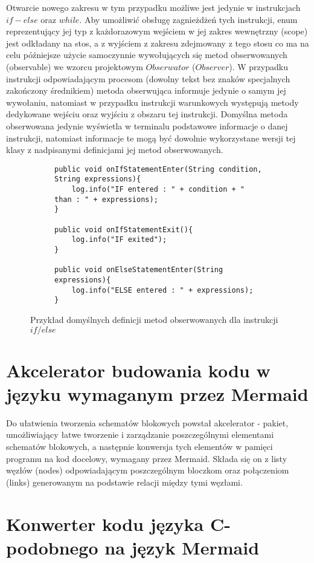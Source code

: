 \begin{itemize}
	 Otwarcie nowego zakresu w tym przypadku możliwe jest jedynie w instrukcjach $if - else$ oraz $while$. Aby umożliwić obsługę zagnieżdżeń tych instrukcji, enum reprezentujący jej typ z każdorazowym wejściem w jej zakres wewnętrzny (scope) jest odkładany na stos, a z wyjściem z zakresu zdejmowany z tego stosu co ma na celu późniejsze użycie samoczynnie wywołujących się metod obserwowanych (observable) we wzorcu projektowym $Obserwator$ ($Observer$). W przypadku instrukcji odpowiadającym procesom (dowolny tekst bez znaków specjalnych zakończony średnikiem) metoda obserwująca informuje jedynie o samym jej wywołaniu, natomiast w przypadku instrukcji warunkowych występują metody dedykowane wejściu oraz wyjściu z obszaru tej instrukcji. Domyślna metoda obserwowana jedynie wyświetla w terminalu podstawowe informacje o danej instrukcji, natomiast informacje te mogą być dowolnie wykorzystane wersji tej klasy z nadpisanymi definicjami jej metod obserwowanych. 
						
\begin{figure}[H]
  \begin{subfigure}{\textwidth}
		\begin{verbatim}
public void onIfStatementEnter(String condition, String expressions){
	log.info("IF entered : " + condition + " than : " + expressions);
}

public void onIfStatementExit(){
	log.info("IF exited");
}

public void onElseStatementEnter(String expressions){
	log.info("ELSE entered : " + expressions);
}
		\end{verbatim}
  \end{subfigure}\hfill
  \caption{Przykład domyślnych definicji metod obserwowanych dla instrukcji $if/else$}
\end{figure}


\end{itemize}

\section{Akcelerator budowania kodu w języku wymaganym przez Mermaid}
	Do ułatwienia tworzenia schematów blokowych powstał akcelerator - pakiet, umożliwiający łatwe tworzenie i zarządzanie poszczególnymi elementami schematów blokowych, a następnie konwersja tych elementów w pamięci programu na kod docelowy, wymagany przez Mermaid. Składa się on z listy węzłów (nodes) odpowiadającym poszczególnym bloczkom oraz połączeniom (links) generowanym na podstawie relacji między tymi węzłami.


\section{Konwerter kodu języka C-podobnego na język Mermaid}
	